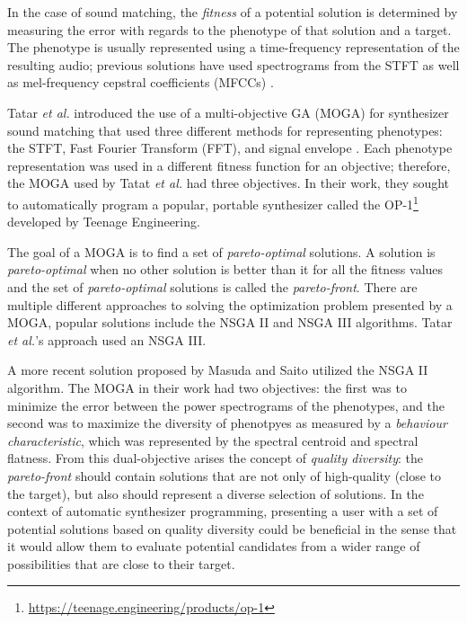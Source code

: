 In the case of sound matching, the \textit{fitness} of a potential solution is determined by measuring the error with regards to the phenotype of that solution and a target. The phenotype is usually represented using a time-frequency representation of the resulting audio; previous solutions have used spectrograms from the STFT \cite{horner1993machine, tatar2016automatic, masudo2021quality} as well as mel-frequency cepstral coefficients (MFCCs) \cite{yee2008synthbot, roth2011comparison, macret2014automatic, smith2017play}.


Tatar \textit{et al.} introduced the use of a multi-objective GA (MOGA) for synthesizer sound matching that used three different methods for representing phenotypes: the STFT, Fast Fourier Transform (FFT), and signal envelope \cite{tatar2016automatic}. Each phenotype representation was used in a different fitness function for an objective; therefore, the MOGA used by Tatat \textit{et al.} had three objectives. In their work, they sought to automatically program a popular, portable synthesizer called the OP-1\footnote{\url{https://teenage.engineering/products/op-1}} developed by Teenage Engineering.

The goal of a MOGA is to find a set of \textit{pareto-optimal} solutions. A solution is \textit{pareto-optimal} when no other solution is better than it for all the fitness values and the set of \textit{pareto-optimal} solutions is called the \textit{pareto-front}. There are multiple different approaches to solving the optimization problem presented by a MOGA, popular solutions include the NSGA II \cite{deb2002fast} and NSGA III \cite{deb2013evolutionary} algorithms. Tatar \textit{et al.}'s approach used an NSGA III. 

A more recent solution proposed by Masuda and Saito \cite{masudo2021quality} utilized the NSGA II algorithm. The MOGA in their work had two objectives: the first was to minimize the error between the power spectrograms of the phenotypes, and the second was to maximize the diversity of phenotpyes as measured by a \textit{behaviour characteristic}, which was represented by the spectral centroid and spectral flatness. From this dual-objective arises the concept of \textit{quality diversity}: the \textit{pareto-front} should contain solutions that are not only of high-quality (close to the target), but also should represent a diverse selection of solutions. In the context of automatic synthesizer programming, presenting a user with a set of potential solutions based on quality diversity could be beneficial in the sense that it would allow them to evaluate potential candidates from a wider range of possibilities that are close to their target.

